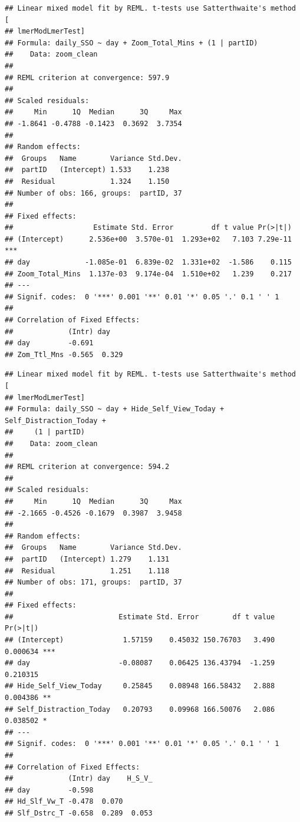 \documentclass[
  english,
  man]{apa7}
\begin{document}
\begin{verbatim}
## Linear mixed model fit by REML. t-tests use Satterthwaite's method [
## lmerModLmerTest]
## Formula: daily_SSO ~ day + Zoom_Total_Mins + (1 | partID)
##    Data: zoom_clean
## 
## REML criterion at convergence: 597.9
## 
## Scaled residuals: 
##     Min      1Q  Median      3Q     Max 
## -1.8641 -0.4788 -0.1423  0.3692  3.7354 
## 
## Random effects:
##  Groups   Name        Variance Std.Dev.
##  partID   (Intercept) 1.533    1.238   
##  Residual             1.324    1.150   
## Number of obs: 166, groups:  partID, 37
## 
## Fixed effects:
##                   Estimate Std. Error         df t value Pr(>|t|)    
## (Intercept)      2.536e+00  3.570e-01  1.293e+02   7.103 7.29e-11 ***
## day             -1.085e-01  6.839e-02  1.331e+02  -1.586    0.115    
## Zoom_Total_Mins  1.137e-03  9.174e-04  1.510e+02   1.239    0.217    
## ---
## Signif. codes:  0 '***' 0.001 '**' 0.01 '*' 0.05 '.' 0.1 ' ' 1
## 
## Correlation of Fixed Effects:
##             (Intr) day   
## day         -0.691       
## Zom_Ttl_Mns -0.565  0.329
\end{verbatim}

\begin{verbatim}
## Linear mixed model fit by REML. t-tests use Satterthwaite's method [
## lmerModLmerTest]
## Formula: daily_SSO ~ day + Hide_Self_View_Today + Self_Distraction_Today +  
##     (1 | partID)
##    Data: zoom_clean
## 
## REML criterion at convergence: 594.2
## 
## Scaled residuals: 
##     Min      1Q  Median      3Q     Max 
## -2.1665 -0.4526 -0.1679  0.3987  3.9458 
## 
## Random effects:
##  Groups   Name        Variance Std.Dev.
##  partID   (Intercept) 1.279    1.131   
##  Residual             1.251    1.118   
## Number of obs: 171, groups:  partID, 37
## 
## Fixed effects:
##                         Estimate Std. Error        df t value Pr(>|t|)    
## (Intercept)              1.57159    0.45032 150.76703   3.490 0.000634 ***
## day                     -0.08087    0.06425 136.43794  -1.259 0.210315    
## Hide_Self_View_Today     0.25845    0.08948 166.58432   2.888 0.004386 ** 
## Self_Distraction_Today   0.20793    0.09968 166.50076   2.086 0.038502 *  
## ---
## Signif. codes:  0 '***' 0.001 '**' 0.01 '*' 0.05 '.' 0.1 ' ' 1
## 
## Correlation of Fixed Effects:
##             (Intr) day    H_S_V_
## day         -0.598              
## Hd_Slf_Vw_T -0.478  0.070       
## Slf_Dstrc_T -0.658  0.289  0.053
\end{verbatim}
\end{document}
